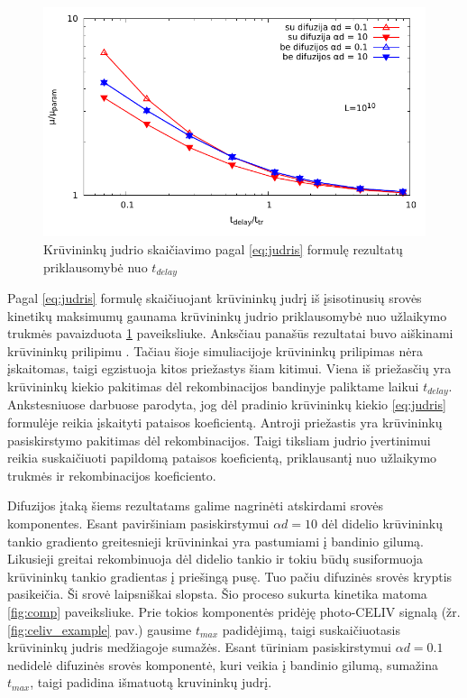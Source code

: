 \begin{figure}[H]
  \centering
	\includegraphics{./media/pdf/log_mobility.pdf}
  \caption{Krūvininkų judrio skaičiavimo pagal \eqref{eq:judris} formulę rezultatų priklausomybė nuo $t_{delay}$}
  \label{fig:mobility}
\end{figure}

Pagal \eqref{eq:judris} formulę skaičiuojant krūvininkų judrį iš įsisotinusių srovės kinetikų maksimumų gaunama krūvininkų judrio priklausomybė nuo užlaikymo trukmės pavaizduota \ref{fig:mobility} paveiksliuke. Anksčiau panašūs rezultatai buvo aiškinami krūvininkų prilipimu \cite{juška:2004290}. Tačiau šioje simuliacijoje krūvininkų prilipimas nėra įskaitomas, taigi egzistuoja kitos priežastys šiam kitimui. Viena iš priežasčių yra krūvininkų kiekio pakitimas dėl rekombinacijos bandinyje paliktame laikui $t_{delay}$. Ankstesniuose darbuose \cite{juška:155202} parodyta, jog dėl pradinio krūvininkų kiekio \eqref{eq:judris} formulėje reikia įskaityti pataisos koeficientą. Antroji priežastis yra krūvininkų pasiskirstymo pakitimas dėl rekombinacijos. Taigi tiksliam judrio įvertinimui reikia suskaičiuoti papildomą pataisos koeficientą, priklausantį nuo užlaikymo trukmės ir rekombinacijos koeficiento.

Difuzijos įtaką šiems rezultatams galime nagrinėti atskirdami srovės komponentes. Esant paviršiniam pasiskirstymui $\alpha d = 10$ dėl didelio krūvininkų tankio gradiento greitesnieji krūvininkai yra pastumiami į bandinio gilumą. Likusieji greitai rekombinuoja dėl didelio tankio ir tokiu būdų susiformuoja krūvininkų tankio gradientas į priešingą pusę. Tuo pačiu difuzinės srovės kryptis pasikeičia. Ši srovė laipsniškai slopsta. Šio proceso sukurta kinetika matoma \ref{fig:comp} paveiksliuke. Prie tokios komponentės pridėję photo-CELIV signalą (žr. \ref{fig:celiv_example} pav.) gausime $t_{max}$ padidėjimą, taigi suskaičiuotasis krūvininkų judris medžiagoje sumažės. Esant tūriniam pasiskirstymui $\alpha d = 0.1$ nedidelė difuzinės srovės komponentė, kuri veikia į bandinio gilumą, sumažina $t_{max}$, taigi padidina išmatuotą kruvininkų judrį.
